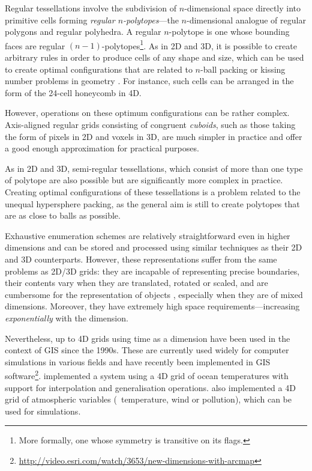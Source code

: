 Regular tessellations involve the subdivision of $n$-dimensional space directly into primitive cells forming \emph{regular $n$-polytopes}---the $n$-dimensional analogue of regular polygons and regular polyhedra.
A regular $n$-polytope is one whose bounding faces are regular $(n-1)$-polytopes\footnote{More formally, one whose symmetry is transitive on its flags.}.
As in 2D and 3D, it is possible to create arbitrary rules in order to produce cells of any shape and size, which can be used to create optimal configurations that are related to $n$-ball packing or kissing number problems in geometry \citep{Conway92}.
For instance, such cells can be arranged in the form of the 24-cell honeycomb in 4D.

However, operations on these optimum configurations can be rather complex.
Axis-aligned regular grids consisting of congruent \emph{cuboids}, such as those taking the form of pixels in 2D and voxels in 3D, are much simpler in practice and offer a good enough approximation for practical purposes.

As in 2D and 3D, semi-regular tessellations, which consist of more than one type of polytope are also possible but are significantly more complex in practice.
Creating optimal configurations of these tessellations is a problem related to the unequal hypersphere packing, as the general aim is still to create polytopes that are as close to balls as possible.

Exhaustive enumeration schemes are relatively straightforward even in higher dimensions and can be stored and processed using similar techniques as their 2D and 3D counterparts.
However, these representations suffer from the same problems as 2D/3D grids: they are incapable of representing precise boundaries, their contents vary when they are translated, rotated or scaled, and are cumbersome for the representation of objects \citep{Fisher97}, especially when they are of mixed dimensions.
Moreover, they have extremely high space requirements---increasing \emph{exponentially} with the dimension.

Nevertheless, up to 4D grids using time as a dimension have been used in the context of GIS since the 1990s.
These are currently used widely for computer simulations in various fields and have recently been implemented in GIS software\footnote{\url{http://video.esri.com/watch/3653/new-dimensions-with-arcmap}}.
\citet{Mason94} implemented a system using a 4D grid of ocean temperatures with support for interpolation and generalisation operations.
\citet{Bernard98} also implemented a 4D grid of atmospheric variables (\eg\ temperature, wind or pollution), which can be used for simulations.

